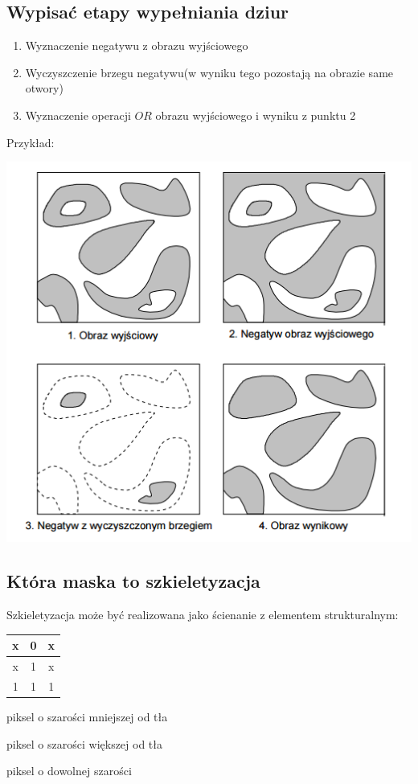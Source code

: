 \documentclass[a4paper, 12pt, titlepage]{article}
\begin{document}
\subsection{Wypisać etapy wypełniania dziur}
\begin{enumerate}[noitemsep]
	\item Wyznaczenie negatywu z obrazu wyjściowego
	\item Wyczyszczenie brzegu negatywu(w wyniku tego pozostają na obrazie same otwory)
	\item Wyznaczenie operacji $OR$ obrazu wyjściowego i wyniku z punktu 2
\end{enumerate}
Przykład: \\
\begin{center}
	\includegraphics[scale=1]{wypelniania_dziur.png}
\end{center}

\subsection{Która maska to szkieletyzacja}
Szkieletyzacja może być realizowana jako ścienanie z elementem strukturalnym: 
\begin{tabular}{|c|c|c|}
	\hline
	x & 0 & x \\ \hline
	x & 1 & x \\ \hline
	1 & 1 & 1 \\ \hline
\end{tabular} 
\begin{description}[noitemsep]
	\item[0] piksel o szarości mniejszej od tła
	\item[1] piksel o szarości większej od tła
	\item[x] piksel o dowolnej szarości
\end{description}
\end{document}
